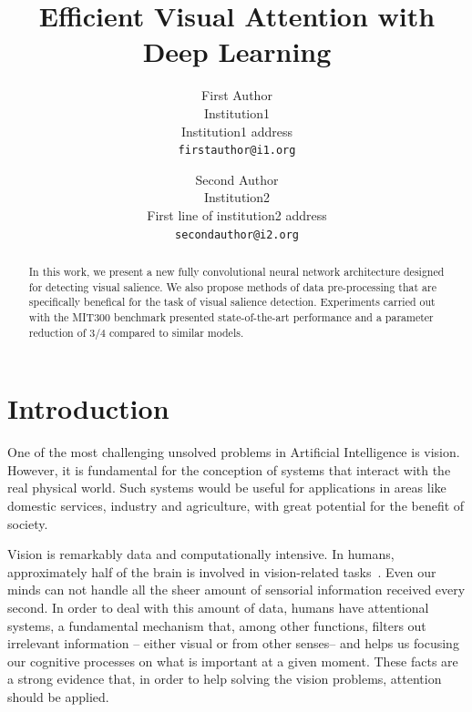 \documentclass[10pt,twocolumn,letterpaper]{article}
\begin{document}
\title{Efficient Visual Attention with Deep Learning}

\author{First Author\\
Institution1\\
Institution1 address\\
{\tt\small firstauthor@i1.org}
\and
Second Author\\
Institution2\\
First line of institution2 address\\
{\tt\small secondauthor@i2.org}
}

\maketitle

\begin{abstract}
In this work, we present a new fully convolutional neural network
architecture designed for detecting visual salience.
We also propose methods of data pre-processing that are specifically
benefical for the task of visual salience detection.
Experiments carried out with the MIT300 benchmark presented state-of-the-art
performance and a parameter reduction of 3/4 compared to similar models.
\end{abstract}

\section{Introduction}
One of the most challenging unsolved problems in Artificial Intelligence
is vision.
However, it is fundamental for the conception of systems that interact
with the real physical world.
Such systems would be useful for applications in areas like
domestic services, industry and agriculture,
with great potential for the benefit of society.

Vision is remarkably data and computationally intensive.
In humans, approximately half of the brain is involved in
vision-related tasks~\cite{fixott_1957}.
Even our minds can not handle all the sheer amount of sensorial information
received every second. In order to deal with this amount of data,
humans have attentional systems, a fundamental mechanism
that, among other functions, filters out irrelevant information
-- either visual or from other senses-- and helps us focusing our cognitive
processes on what is important at a given moment.
These facts are a strong evidence that, in order to help solving the
vision problems, attention should be applied.
\end{document}
